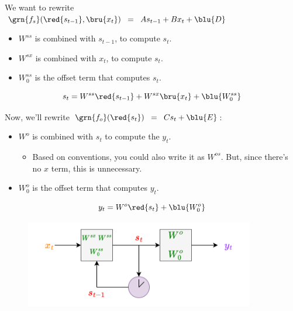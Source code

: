         \begin{notation}
            We want to rewrite $\grn{f_s}(\red{s_{t-1}},\bru{x_t}) 
            \;\;=\;\; As_{t-1} + Bx_t + \blu{D}$
            
            \begin{itemize}
                \item $W^{ss}$ is combined with $s_{t-1}$, to compute $s_t$.
                \item $W^{sx}$ is combined with $x_t$, to compute $s_t$.
                \item $W^{ss}_0$ is the offset term that computes $s_t$.
            \end{itemize}

            \begin{equation*}
                s_t = W^{ss}\red{s_{t-1}} + W^{sx}\bru{x_t} + \blu{W^{ss}_0}
            \end{equation*}

            Now, we'll rewrite $\grn{f_o}(\red{s_t}) 
            \;\;=\;\; Cs_t + \blu{E}$:

            \begin{itemize}
                \item $W^{o}$ is combined with $s_t$ to compute the $y_t$. 
                
                \begin{itemize}
                    \item Based on conventions, you could also write it as $W^{os}$. But, since there's no $x$ term, this is unnecessary.
                \end{itemize}

                \item $W^o_0$ is the offset term that computes $y_t$.
            \end{itemize}

            \begin{equation*}
                y_t = W^o\red{s_t} + \blu{W^o_0}
            \end{equation*}
        \end{notation}

        \begin{figure}[H]
            \centering
            \includegraphics[width=100mm,scale=0.4]{images/rnn_images/rnn_diagram_linear.png}
        \end{figure}

